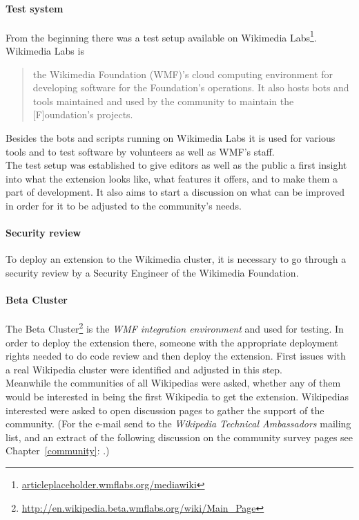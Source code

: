 \paragraph{Test system}
From the beginning there was a test setup available on Wikimedia Labs\footnote{\url{articleplaceholder.wmflabs.org/mediawiki}}. Wikimedia Labs is 
\begin{quotation}
	the Wikimedia Foundation (WMF)'s cloud computing environment for developing software for the Foundation's operations. It also hosts bots and tools maintained and used by the community to maintain the [F]oundation's projects. 
\end{quotation} \citep{wiki:03}
Besides the bots and scripts running on Wikimedia Labs it is used for various tools and to test software by volunteers as well as WMF's staff. \\
The test setup was established to give editors as well as the public a first insight into what the extension looks like, what features it offers, and to make them a part of development. It also aims to start a discussion on what can be improved in order for it to be adjusted to the community's needs.

\paragraph{Security review}
To deploy an extension to the Wikimedia cluster, it is necessary to go through a security review by a Security Engineer of the Wikimedia Foundation. 
  
\paragraph{Beta Cluster}
The Beta Cluster\footnote{\url{http://en.wikipedia.beta.wmflabs.org/wiki/Main_Page}} is the \textit{WMF integration environment} and used for testing. In order to deploy the extension there, someone with the appropriate deployment rights needed to do code review and then deploy the extension. First issues with a real Wikipedia cluster were identified and adjusted in this step. \\
Meanwhile the communities of all Wikipedias were asked, whether any of them would be interested in being the first Wikipedia to get the extension. Wikipedias interested were asked to open discussion pages to gather the support of the community. (For the e-mail send to the \textit{Wikipedia Technical Ambassadors} mailing list, and an extract of the following discussion on the community survey pages see Chapter~\ref{community}: .)

